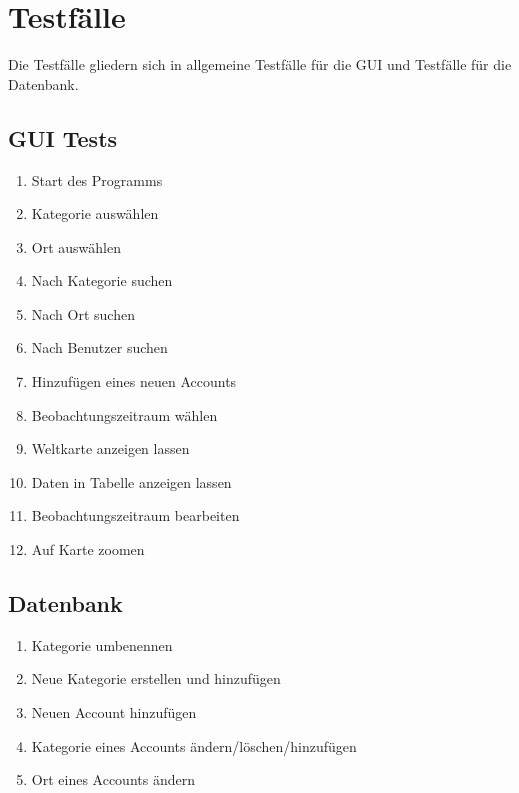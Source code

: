 
\section{Testfälle}

Die Testfälle gliedern sich in allgemeine Testfälle für die GUI und Testfälle für die Datenbank.

	\subsection{GUI Tests}
	\begin{enumerate}[align=left, leftmargin=4em, label={\textbf{\textbackslash T10\arabic*0\textbackslash}} ]
	\item Start des Programms
	\item Kategorie auswählen
	\item Ort auswählen
	\item Nach Kategorie suchen
	\item Nach Ort suchen
	\item Nach Benutzer suchen
	\item Hinzufügen eines neuen Accounts
	\item Beobachtungszeitraum wählen
	\item Weltkarte anzeigen lassen
	\item Daten in Tabelle anzeigen lassen
	\item Beobachtungszeitraum bearbeiten
	\item Auf Karte zoomen
	\end{enumerate}
	
	\subsection{Datenbank}
	\begin{enumerate}[align=left, leftmargin=4em, label={\textbf{\textbackslash T20\arabic*0\textbackslash}} ]
		\item Kategorie umbenennen
		\item Neue Kategorie erstellen und hinzufügen
		\item Neuen Account hinzufügen
		\item Kategorie eines Accounts ändern/löschen/hinzufügen
		\item Ort eines Accounts ändern
	\end{enumerate}

